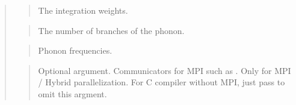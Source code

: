 \documentclass[letterpaper,10pt,pdftex,openany,english]{sphinxmanual}
\begin{document}
\begin{quote}
\begin{quote}
\sphinxAtStartPar
The integration weights.
\end{quote}

\begin{sphinxVerbatim}[commandchars=\\\{\}]
\end{sphinxVerbatim}
\begin{quote}

\sphinxAtStartPar
The number of branches of the phonon.
\end{quote}

\begin{sphinxVerbatim}[commandchars=\\\{\}]
\end{sphinxVerbatim}
\begin{quote}

\sphinxAtStartPar
Phonon frequencies.
\end{quote}

\begin{sphinxVerbatim}[commandchars=\\\{\}]
\end{sphinxVerbatim}
\begin{quote}

\sphinxAtStartPar
Optional argument. Communicators for MPI such as .
Only for MPI / Hybrid parallelization.
For C compiler without MPI, just pass  to omit this argment.
\end{quote}
\end{quote}
\end{document}
